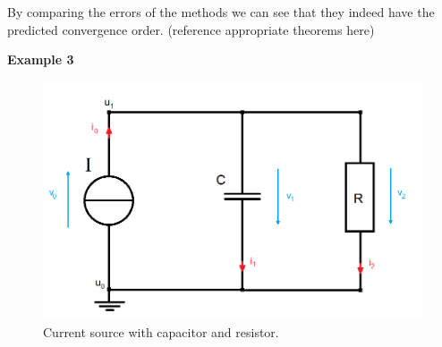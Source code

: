 
	By comparing the errors of the methods we can see that they indeed have the predicted convergence order. (reference appropriate theorems here)

	\textbf{Example 3} \\
	
	\begin{figure}[H]
		\centering
		\includegraphics[scale=0.4]{pictures/Example3.png}
		\caption{Current source with capacitor and resistor.}
	\end{figure}
	
